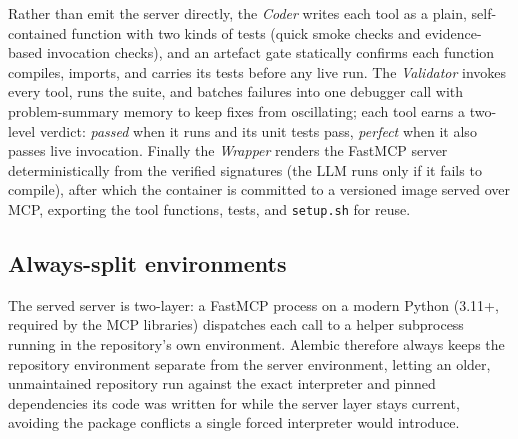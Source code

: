 Rather than emit the server directly, the \emph{Coder} writes each tool as a
plain, self-contained function with two kinds of tests (quick smoke checks and
evidence-based invocation checks), and an artefact gate statically confirms
each function compiles, imports, and carries its tests before any live run. The
\emph{Validator} invokes every tool, runs the suite, and batches failures into
one debugger call with problem-summary memory to keep fixes from oscillating;
each tool earns a two-level verdict: \emph{passed} when it runs and its unit
tests pass, \emph{perfect} when it also passes live invocation. Finally the
\emph{Wrapper} renders the FastMCP server deterministically from the verified
signatures (the LLM runs only if it fails to compile), after which the container
is committed to a versioned image served over MCP, exporting the tool functions,
tests, and \texttt{setup.sh} for reuse.

\subsection{Always-split environments}
The served server is two-layer: a FastMCP process on a modern Python (3.11+,
required by the MCP libraries) dispatches each call to a helper subprocess
running in the repository's own environment. Alembic therefore always keeps the
repository environment separate from the server environment, letting an older,
unmaintained repository run against the exact interpreter and pinned dependencies
its code was written for while the server layer stays current, avoiding the
package conflicts a single forced interpreter would introduce.
